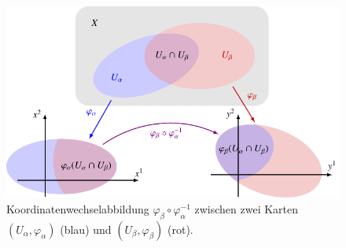 %
%
%
\begin{figure}
\centering
\includegraphics{chapters/020-koordinaten/images/koordinatenwechsel.pdf}
\caption{Koordinatenwechselabbildung $\varphi_\beta\circ\varphi_\alpha^{-1}$
zwischen zwei Karten $(U_\alpha,\varphi_\alpha)$ ({\color{blue}blau}) und
$(U_\beta,\varphi_\beta)$ ({\color{darkred}rot}).
\label{buch:koordinaten:diffmannig:fig:koordinatenwechsel}}
\end{figure}
